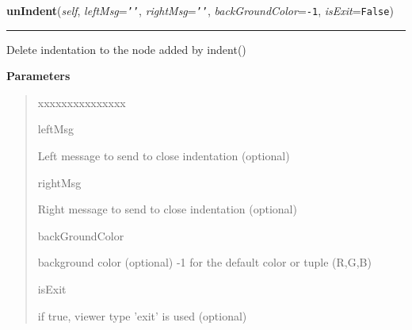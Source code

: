 \hspace{.8\funcindent}\begin{boxedminipage}{\funcwidth}

    \raggedright \textbf{unIndent}(\textit{self}, \textit{leftMsg}={\tt \texttt{'}\texttt{}\texttt{'}}, \textit{rightMsg}={\tt \texttt{'}\texttt{}\texttt{'}}, \textit{backGroundColor}={\tt -1}, \textit{isExit}={\tt False})

    \vspace{-1.5ex}

    \rule{\textwidth}{0.5\fboxrule}
\setlength{\parskip}{2ex}
    Delete indentation to the node added by indent()

\setlength{\parskip}{1ex}
      \textbf{Parameters}
      \vspace{-1ex}

      \begin{quote}
        \begin{Ventry}{xxxxxxxxxxxxxxx}

          \item[leftMsg]

          Left message to send to close indentation (optional)

          \item[rightMsg]

          Right message to send to close indentation (optional)

          \item[backGroundColor]

          background color (optional) -1 for the default color or tuple 
          (R,G,B)

          \item[isExit]

          if true, viewer type 'exit' is used (optional)

        \end{Ventry}

      \end{quote}

    \end{boxedminipage}

    \label{tracetool:TraceToSend:enterMethod}

    \vspace{0.5ex}


